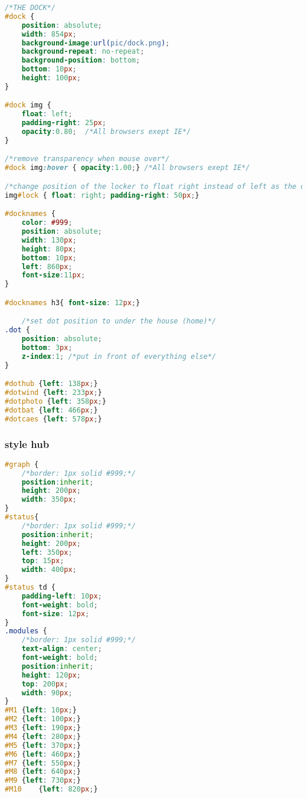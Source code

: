 \begin{lstlisting}[language=CSS] 
/*THE DOCK*/
#dock {
	position: absolute;
	width: 854px;
	background-image:url(pic/dock.png);
	background-repeat: no-repeat;
	background-position: bottom;
	bottom: 10px;
	height: 100px;
}

#dock img {
	float: left;
	padding-right: 25px;
	opacity:0.80;  /*All browsers exept IE*/
}

/*remove transparency when mouse over*/
#dock img:hover { opacity:1.00;} /*All browsers exept IE*/

/*change position of the locker to float right instead of left as the other link(s)*/
img#lock { float: right; padding-right: 50px;}

#docknames {
	color: #999;
	position: absolute;
	width: 130px;
	height: 80px;
	bottom: 10px;
	left: 860px;
	font-size:11px;
}

#docknames h3{ font-size: 12px;}

	/*set dot position to under the house (home)*/
.dot {
	position: absolute;
	bottom: 3px;
	z-index:1; /*put in front of everything else*/
}

#dothub {left: 138px;}
#dotwind {left: 233px;}
#dotphoto {left: 358px;}
#dotbat {left: 466px;}
#dotcaes {left: 578px;}
\end{lstlisting}

\subsubsection{style hub}
\begin{lstlisting}[language=CSS] 
#graph {
	/*border: 1px solid #999;*/
	position:inherit;
	height: 200px;
	width: 350px;
}
#status{
	/*border: 1px solid #999;*/
	position:inherit;
	height: 200px;
	left: 350px;
	top: 15px;
	width: 400px;
}
#status td {
	padding-left: 10px;
	font-weight: bold;
	font-size: 12px;
}
.modules {
	/*border: 1px solid #999;*/
	text-align: center;
	font-weight: bold;
	position:inherit;
	height: 120px;
	top: 200px;
	width: 90px;
}
#M1	{left: 10px;}
#M2	{left: 100px;}
#M3	{left: 190px;}
#M4	{left: 280px;}
#M5	{left: 370px;}
#M6	{left: 460px;}
#M7	{left: 550px;}
#M8	{left: 640px;}
#M9	{left: 730px;}
#M10	{left: 820px;}
\end{lstlisting}

